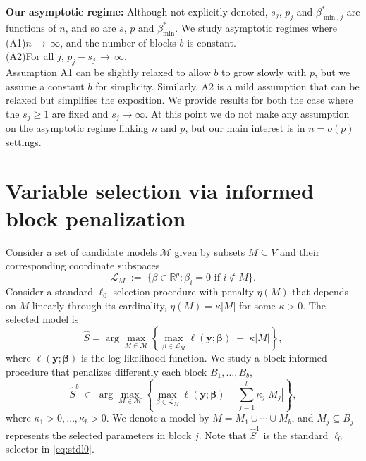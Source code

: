 \documentclass[aos]{imsart}
\theoremstyle{plain}
\newcommand{\R}{\mathbb{R}}
\newcommand{\M}{\mathcal{M}}
\newcommand{\bs}{\boldsymbol}
\begin{document}
\noindent\textbf{Our asymptotic regime:} Although not explicitly denoted, $s_j$, $p_j$ and $\beta_{\min,j}^*$ are functions of $n$, and so are $s$, $p$ and $\beta_{\min}^*$. We study asymptotic regimes where \\[5pt]
     (A1)\quad $n \,\to \, \infty$, and the number of blocks $b$ is constant. \\[5pt]
     (A2)\quad For all $j$, $p_j-s_j \,\to \, \infty$.\\[5pt]
Assumption A1 can be slightly relaxed to allow $b$ to grow slowly with $p$, but we assume a constant $b$ for simplicity.
Similarly, A2 is a mild assumption that can be relaxed but simplifies the exposition. We provide results for both the case where the $s_j\geq1$ are fixed and $s_j \rightarrow \infty$.
 At this point we do not make any assumption on the asymptotic regime linking $n$ and $p$, but our main interest is in $n= o(p)$ settings.

\section{Variable selection via informed block penalization}\label{sec:intro_blockpen}

Consider a set of candidate models $\M$ given by subsets $M\subseteq V$ and their corresponding coordinate subspaces
$$
\mathcal{L}_M\;:=\;\{\beta\in \R^p: \beta_i=0\mbox{ if }i\notin M\}.
$$
Consider a standard $\ell_0$ selection procedure with penalty $\eta(M)$ that depends on $M$ linearly through its cardinality, $\eta(M)=\kappa |M|$ for some $\kappa>0$. The selected model is
\begin{equation}\label{eq:stdl0}
\hat{S}= \arg\max_{M\in \M} \left\{\max_{\beta\in \mathcal{L}_M}\ell(\bs y; \bs \beta)\;-\;\kappa |M|\right\},
\end{equation}
where $\ell(\bs y; \bs \beta)$ is the log-likelihood function. 
We study a block-informed procedure that penalizes differently each block $B_1,\ldots,B_b$,
\begin{equation}\label{eq:Mhat}
  \hat S^b\;\in\;\arg\max_{M\in \M} \left\{\max_{\beta\in \mathcal{L}_M}\ell(\bs y; \bs \beta)-\sum_{j=1}^b\kappa_j |M_j| \right\},
\end{equation}
where $\kappa_1>0,\ldots,\kappa_b>0$. We denote a model by $M=M_1\cup\cdots\cup M_b$, and $M_j\subseteq B_j$ represents the  selected parameters in block $j$.
Note that $\hat{S}^1$ is the standard $\ell_0$ selector in \eqref{eq:stdl0}.
\end{document}
